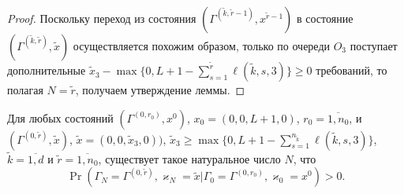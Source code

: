 \documentclass[a4paper,12pt,russian]{extarticle}
\begin{document}
\begin{proof}
Поскольку переход из состояния $(\Gamma^{(\tilde{k},\tilde{r}-1)}, x^{\tilde{r}-1})$ в состояние  $(\Gamma^{(\tilde{k},\tilde{r})}, \tilde{x})$ осуществляется похожим образом, только по очереди $O_3$ поступает дополнительные $\tilde{x}_3 - \max{\{0,L+1-\sum_{s=1}^{\tilde{r}} \ell(\tilde{k},s,3)\}}\geqslant 0$ требований, то полагая $N=\tilde{r}$, получаем утверждение леммы.
\end{proof}


\begin{lemma}
Для любых состояний $(\Gamma^{(0,r_0)},x^0)$, $x_0=(0,0,L+1,0)$, $r_0=\overline{1,n_0}$, и
$(\Gamma^{(0,\tilde{r})},\tilde{x})$,
$\tilde{x}=(0,0,\tilde{x}_3,0))$, $\tilde{x}_3 \geqslant \max{\{0,L+1-\sum_{s=1}^{n_{\tilde{k}}} \ell(\tilde{k},s,3)\}}$,
$\tilde{k}=\overline{1,d}$ и $\tilde{r} = \overline{1,n_0}$, существует такое натуральное число $N$, что 
\begin{equation*}
\Pr(\Gamma_{N}=\Gamma^{(0,\tilde{r} )}, \varkappa_{N}=\tilde{x}|
\Gamma_{0}=\Gamma^{(0,r_0)}, \varkappa_{0}=x^0)>0.
\end{equation*}
\end{lemma}
\end{document}
